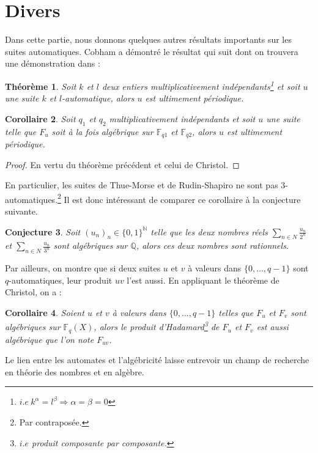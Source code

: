 \documentclass[12pt]{article}
\theoremstyle{plain}
\newtheorem{theoreme}{Th\'eor\`eme}
\newtheorem{corollaire}[theoreme]{Corollaire}
\newtheorem{conjecture}[theoreme]{Conjecture}
\theoremstyle{definition}
\theoremstyle{remark}
\begin{document}
\section{Divers}
Dans cette partie, nous donnons quelques autres r\'esultats importants sur les suites automatiques. Cobham a d\'emontr\'e le r\'esultat qui suit dont on trouvera une d\'emonstration dans \cite{Allouche03} :

\begin{theoreme}
  Soit $k$ et $l$ deux entiers multiplicativement ind\'ependants\footnote{$i.e\ k^{\alpha}=l^{\beta}
  \Rightarrow{\alpha=\beta=0}$} et soit $u$ une suite $k$ et $l$-automatique, alors $u$ est
  ultimement p\'eriodique.
\end{theoreme}

\begin{corollaire}
  Soit $q_{1}$ et $q_{2}$ multiplicativement ind\'ependants et soit $u$ une suite telle que $F_{u}$ 
  soit \`a la fois alg\'ebrique sur $\mathbb{F}_{q1}$ et $\mathbb{F}_{q2}$, alors $u$ est ultimement
  p\'eriodique.
\end{corollaire}

\begin{proof}
  En vertu du th\'eor\`eme pr\'ec\'edent et celui de Christol.
\end{proof}

En particulier, les suites de Thue-Morse et de Rudin-Shapiro ne sont pas 3-automatiques.\footnote{Par contrapos\'ee.} Il est donc int\'eressant de comparer ce corollaire \`a la conjecture suivante.

\begin{conjecture}
  Soit $(u_{n})_{n}\in\{0,1\}^{\mathbb{N}}$ telle que les deux nombres r\'eels $\sum_{n\in{N}}\frac{u_{n}}{2^{n}}$ et $
  \sum_{n\in{N}}\frac{u_{n}}{3^{n}}$ sont alg\'ebriques sur $\mathbb{Q}$, alors ces deux nombres sont rationnels.
\end{conjecture}

Par ailleurs, on montre que si deux suites $u$ et $v$ \`a valeurs dans $\{0,\ldots,q-1\}$ sont $q$-automatiques, leur produit $uv$ l'est aussi. En appliquant le th\'eor\`eme de Christol, on a :

\begin{corollaire}
  Soient $u$ et $v$ \`a valeurs dans $\{0,\ldots,q-1\}$ telles que $F_{u}$ et $F_{v}$ sont alg\'ebriques sur $\mathbb
  {F}_{q}(X)$, alors le produit d'Hadamard\footnote{$i.e$ produit composante par composante.} de $F_{u}$ et $F_{v}$ est 
  aussi alg\'ebrique que l'on note $F_{uv}$.
\end{corollaire}

Le lien entre les automates et l'alg\'ebricit\'e laisse entrevoir un champ de recherche en th\'eorie des nombres et en alg\`ebre.



\end{document}
